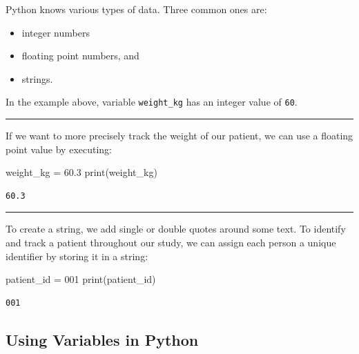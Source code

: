 \documentclass[
  letterpaper,
  DIV=11,
  numbers=noendperiod]{scrartcl}
\newenvironment{Shaded}{\begin{snugshade}}{\end{snugshade}}
\newcommand{\BuiltInTok}[1]{\textcolor[rgb]{0.00,0.23,0.31}{#1}}
\newcommand{\FloatTok}[1]{\textcolor[rgb]{0.68,0.00,0.00}{#1}}
\newcommand{\NormalTok}[1]{\textcolor[rgb]{0.00,0.23,0.31}{#1}}
\newcommand{\OperatorTok}[1]{\textcolor[rgb]{0.37,0.37,0.37}{#1}}
\newcommand{\StringTok}[1]{\textcolor[rgb]{0.13,0.47,0.30}{#1}}
\providecommand{\tightlist}{%
  \setlength{\itemsep}{0pt}\setlength{\parskip}{0pt}}
\begin{document}
Python knows various types of data. Three common ones are:

\begin{itemize}
\tightlist
\item
  integer numbers
\item
  floating point numbers, and
\item
  strings.
\end{itemize}

In the example above, variable \texttt{weight\_kg} has an integer value
of \texttt{60}.

\begin{center}\rule{0.5\linewidth}{0.5pt}\end{center}

If we want to more precisely track the weight of our patient, we can use
a floating point value by executing:

\begin{Shaded}
\begin{Highlighting}[]
\NormalTok{weight\_kg }\OperatorTok{=} \FloatTok{60.3}
\BuiltInTok{print}\NormalTok{(weight\_kg)}
\end{Highlighting}
\end{Shaded}

\begin{verbatim}
60.3
\end{verbatim}

\begin{center}\rule{0.5\linewidth}{0.5pt}\end{center}

To create a string, we add single or double quotes around some text. To
identify and track a patient throughout our study, we can assign each
person a unique identifier by storing it in a string:

\begin{Shaded}
\begin{Highlighting}[]
\NormalTok{patient\_id }\OperatorTok{=} \StringTok{\textquotesingle{}001\textquotesingle{}}
\BuiltInTok{print}\NormalTok{(patient\_id)}
\end{Highlighting}
\end{Shaded}

\begin{verbatim}
001
\end{verbatim}

\subsection{Using Variables in Python}\label{using-variables-in-python}
\end{document}
